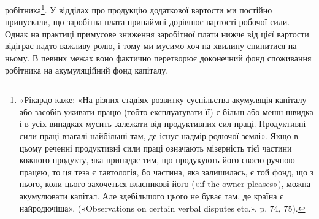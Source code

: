 \parcont{}  %
робітника\footnote{
«Рікардо каже: «На різних стадіях розвитку суспільства акумуляція
капіталу або засобів уживати працю (тобто експлуатувати її)
є більш або менш швидка і в усіх випадках мусить залежати від продуктивних
сил праці. Продуктивні сили праці взагалі найбільші там, де
існує надмір родючої землі». Якщо в цьому реченні продуктивні сили
праці означають мізерність тієї частини кожного продукту, яка припадає
тим, що продукують його своєю ручною працею, то ця теза є тавтологія,
бо частина, яка залишилась, є той фонд, що з нього, коли цього захочеться
власникові його («if the owner pleases»), можна акумулювати капітал.
Але здебільшого цього не буває там, де країна є найродючіша».
(«Observations on certain verbal disputes etc.», p. 74, 75).
}. У відділах про продукцію додаткової вартости ми
постійно припускали, що заробітна плата принаймні дорівнює
вартості робочої сили. Однак на практиці примусове зниження
заробітної плати нижче від цієї вартости відіграє надто важливу
ролю, і тому ми мусимо хоч на хвилину спинитися на ньому.
В певних межах воно фактично перетворює доконечний фонд
споживання робітника на акумуляційний фонд капіталу.

